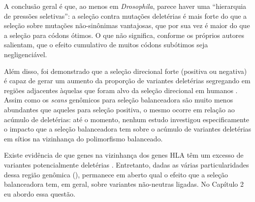 \begin{refsection}
A conclusão geral é que, ao menos em \emph{Drosophila}, parece haver uma “hierarquia de pressões seletivas”: a seleção contra mutações deletérias é mais forte do que a seleção sobre mutações não-sinônimas vantajosas, que por sua vez é maior do que a seleção para códons ótimos. O que não significa, conforme os próprios autores salientam, que o efeito cumulativo de muitos códons subótimos seja negligenciável. 

Além disso, foi demonstrado que a seleção direcional forte (positiva ou negativa) é capaz de gerar um aumento da proporção de variantes deletérias segregando em regiões adjacentes àquelas que foram alvo da seleção direcional em humanos \parencite{Chun2011}. Assim como os \emph{scans} genômicos para seleção balanceadora são muito menos abundantes que aqueles para seleção positiva, o mesmo ocorre em relação ao acúmulo de deletérias: até o momento, nenhum estudo investigou especificamente o impacto que a seleção balanceadora tem sobre o acúmulo de variantes deletérias em sítios na vizinhança do polimorfismo balanceado. 

Existe evidência de que genes na vizinhança dos genes HLA têm um excesso de variantes potencialmente deletérias \parencite{Mendes2013,Lenz2016}. Entretanto,  dadas as várias particularidades dessa região genômica (\cite{Meyer2006}), permanece em aberto qual o efeito que a seleção balanceadora tem, em geral, sobre variantes não-neutras ligadas. No Capítulo 2 eu abordo essa questão.
% 
%
\newpage

\end{refsection}
